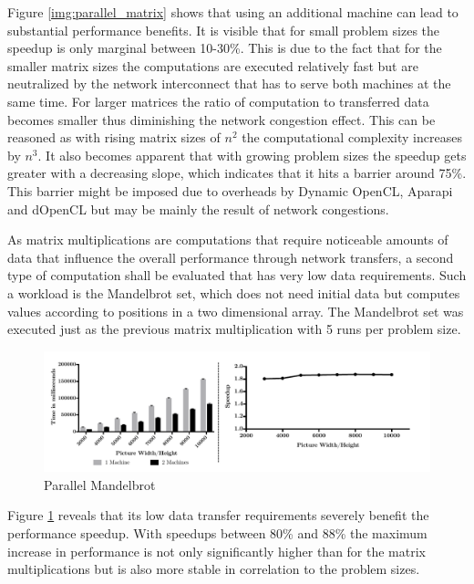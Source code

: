 Figure \ref{img:parallel_matrix} shows that using an additional machine can lead to substantial performance benefits. It is visible that for small problem sizes the speedup is only marginal between 10-30\%. This is due to the fact that for the smaller matrix sizes the computations are executed relatively fast but are neutralized by the network interconnect that has to serve both machines at the same time. For larger matrices the ratio of computation to transferred data becomes smaller thus diminishing the network congestion effect. This can be reasoned as with rising matrix sizes of $n^2$ the computational complexity increases by $n^3$. It also becomes apparent that with growing problem sizes the speedup gets greater with a decreasing slope, which indicates that it hits a barrier around 75\%. This barrier might be imposed due to overheads by Dynamic OpenCL, Aparapi and dOpenCL but may be mainly the result of network congestions.

As matrix multiplications are computations that require noticeable amounts of data that influence the overall performance through network transfers, a second type of computation shall be evaluated that has very low data requirements. Such a workload is the Mandelbrot set, which does not need initial data but computes values according to positions in a two dimensional array. The Mandelbrot set was executed just as the previous matrix multiplication with 5 runs per problem size.

\begin{figure}[H]
	
	\includegraphics[width=1.0\textwidth]{images/sharded_mandelbrot.pdf}
	\centering
	\caption{Parallel Mandelbrot}
	\label{img:parallel_mandelbrot}
\end{figure}

Figure \ref{img:parallel_mandelbrot} reveals that its low data transfer requirements severely benefit the performance speedup. With speedups between 80\% and 88\% the maximum increase in performance is not only significantly higher than for the matrix multiplications but is also more stable in correlation to the problem sizes.


